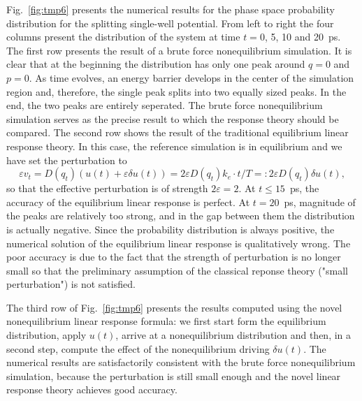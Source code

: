\documentclass[]{tMPH2e}
\newcommand{\eps}{\varepsilon}
\newcommand{\mt}{\mathcal T}
\begin{document}
Fig.~\ref{fig:tmp6} presents the numerical results for  the phase space probability distribution for the splitting
single-well potential. From left to right the four columns present the
distribution of the system at time $t = 0$, 5, 10 and 20~\textsf{ps}. The first
row presents the result of a brute force nonequilibrium simulation.  It is clear
that at the beginning the distribution has only one peak around $q = 0$ and $p = 0$. As  time evolves, an energy barrier develops
in the center of the simulation region and, therefore, the single peak
splits into two equally sized peaks.  In the end, the two
peaks are entirely seperated.  The brute force nonequilibrium
simulation serves as the precise result to which the response theory
should be compared. The second row shows the result of the
traditional equilibrium linear response theory. In
this case, the reference simulation is in equilibrium and we have set the perturbation to
\[
\eps v_t = D(q_{t}) (u(t)+\eps\delta u(t))=2\eps D(q_{t})k_e\cdot t/T=:2\eps D(q_{t})\delta u(t),
\] 
so that the effective perturbation is of strength $2\eps = 2$.  At $t \leq
15$~\textsf{ps}, the accuracy of the equilibrium linear response is
perfect. At $t =
20$~\textsf{ps}, magnitude of the peaks are relatively too strong,
and in the gap between them the distribution is actually negative.
Since the probability distribution is always positive, the
numerical solution of the equilibrium linear response is qualitatively wrong.
The poor accuracy is due to the fact that the strength of perturbation is no
longer small so that the preliminary assumption of the classical reponse theory ("small perturbation")
is not satisfied.  

The third row of Fig.~\ref{fig:tmp6} presents the results computed using the novel nonequilibrium  linear response formula: we first start form the equilibrium distribution, apply  $u(t)$, arrive at a nonequilibrium distribution and then, in a second step, compute the effect of the nonequilibrium driving $\delta u(t)$.  The numerical results are satisfactorily consistent with
the brute force nonequilibrium simulation, because the perturbation is still  small enough and the novel linear response theory achieves
good accuracy.

\end{document}
